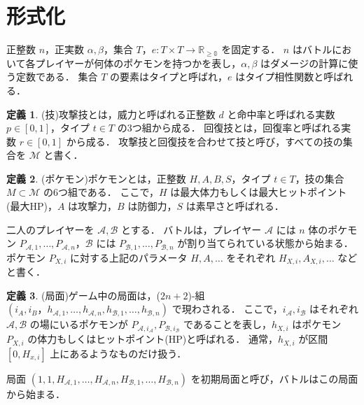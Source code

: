 \documentclass{jsarticle}
\theoremstyle{definition}
\newtheorem{definition}{定義}
\begin{document}
\section{形式化}
正整数 $n$，正実数 $\alpha,\beta$，集合 $T$，$e\colon T \times T \to \mathbb{R_{\ge 0}}$ を固定する．
$n$ はバトルにおいて各プレイヤーが何体のポケモンを持つかを表し，$\alpha,\beta$ はダメージの計算に使う定数である．
集合 $T$ の要素はタイプと呼ばれ，$e$ はタイプ相性関数と呼ばれる．
\begin{definition}
(技)攻撃技とは，威力と呼ばれる正整数 $d$ と命中率と呼ばれる実数 $p\in [0,1]$，タイプ $t\in T$ の3つ組から成る．
回復技とは，回復率と呼ばれる実数 $r \in [0,1]$ から成る．
攻撃技と回復技を合わせて技と呼び，すべての技の集合を $\mathcal M$ と書く．
\end{definition}
\begin{definition}
(ポケモン)ポケモンとは，正整数 $H,A,B,S$，タイプ $t \in T$，技の集合 $M\subset \mathcal M$ の6つ組である．
ここで，$H$ は最大体力もしくは最大ヒットポイント(最大HP)，$A$ は攻撃力，$B$ は防御力，$S$ は素早さと呼ばれる．
\end{definition}
二人のプレイヤーを $\mathcal A,\mathcal B$ とする．
バトルは，プレイヤー $\mathcal A$ には $n$ 体のポケモン $P_{\mathcal A,1},\dots,P_{\mathcal A,n}$，$\mathcal B$ には $P_{\mathcal B,1},\dots,P_{\mathcal B,n}$ が割り当てられている状態から始まる．
ポケモン $P_{X,i}$ に対する上記のパラメータ $H,A,\dots$ をそれぞれ $H_{X,i},A_{X,i},\dots$ などと書く．
\begin{definition}
(局面)ゲーム中の局面は，($2n+2$)-組 $(i_A,i_B，h_{\mathcal A,1},\dots,h_{\mathcal A,n},h_{\mathcal B,1},\dots,h_{\mathcal B,n})$ で現わされる．
ここで，$i_\mathcal A,i_\mathcal B$ はそれぞれ $\mathcal A,\mathcal B$ の場にいるポケモンが $P_{\mathcal A,i_\mathcal A},P_{\mathcal B,i_\mathcal B}$ であることを表し，$h_{X,i}$ はポケモン $P_{X,i}$ の体力もしくはヒットポイント(HP)と呼ばれる．
通常，$h_{X,i}$ が区間 $[0,H_{x,i}]$ 上にあるようなものだけ扱う．

局面 $(1,1,H_{\mathcal A,1},\dots,H_{\mathcal A,n},H_{\mathcal B,1},\dots,H_{\mathcal B,n})$ を初期局面と呼び，バトルはこの局面から始まる．
\end{definition}
\end{document}
